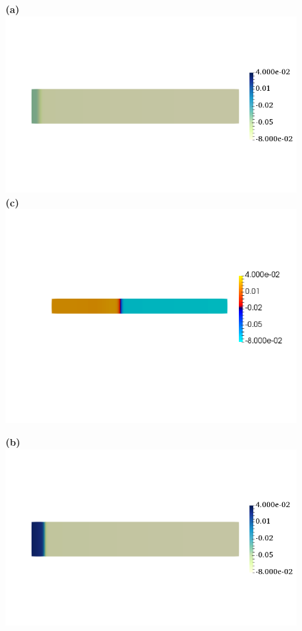 \documentclass[12pt,a4paper]{article}
\begin{document}
\begin{figure}

\begin{minipage}{0.47\textwidth}
 \textbf{(a)} \includegraphics[trim=9cm 0cm 2cm 0cm, clip=true, width=0.9\linewidth]{v5}
      \textbf{(c)} \includegraphics[trim=9cm 0cm 2cm 0cm, clip=true, width=0.9\linewidth]{v40}
    \end{minipage}
    \begin{minipage}{0.47\textwidth}
  \textbf{(b)} \includegraphics[trim=9cm 0cm 2cm 0cm, clip=true, width=0.9\linewidth]{v15}

\end{minipage}
\end{figure}
\end{document}

